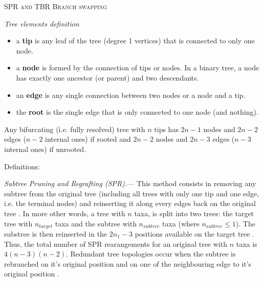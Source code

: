 \documentclass[12pt,letterpaper]{article}
\renewcommand{\section}[1]{%
\bigskip
\begin{center}
\begin{Large}
\normalfont\scshape #1
\medskip
\end{Large}
\end{center}}
\renewcommand{\subsection}[1]{%
\bigskip
\begin{center}
\begin{large}
\normalfont\itshape #1
\end{large}
\end{center}}
\renewcommand{\subsubsection}[1]{%
\vspace{2ex}
\noindent
\textit{#1.}---}
\begin{document}
\section{SPR and TBR Branch swapping}

\subsection{Tree elements definition}
\begin{itemize}
    \item a \textbf{tip} is any leaf of the tree (degree 1 vertices) that is connected to only one node.
    \item a \textbf{node} is formed by the connection of tips or nodes. In a binary tree, a node has exactly one ancestor (or parent) and two descendants.
    \item an \textbf{edge} is any single connection between two nodes or a node and a tip.
    \item the \textbf{root} is the single edge that is only connected to one node (and nothing).
\end{itemize}
Any bifurcating (i.e. fully resolved) tree with $n$ tips has $2n-1$ nodes and $2n-2$ edges ($n-2$ internal ones) if rooted and $2n-2$ nodes and $2n-3$ edges ($n-3$ internal ones) if unrooted.

Definitions: \cite{allen2001subtree,felsenstein2004inferring}

\subsubsection{Subtree Pruning and Regrafting (SPR)}
This method consists in removing any subtree from the original tree (including all trees with only one tip and one edge, i.e. the terminal nodes) and reinserting it along every edges back on the original tree \citep[see Fig \ref{Figure_Felsenstein};]{felsenstein2004inferring}.
In more other words, a tree with $n$ taxa, is split into two trees: the target tree with $n_{target}$ taxa and the subtree with $n_{subtree}$ taxa (where $n_{subtree} \leq 1$).
The substree is then reinserted in the $2n_{1}-3$ positions available on the target tree \citep{felsenstein2004inferring}.
Thus, the total number of SPR rearangements for an original tree with $n$ taxa is $4(n-3)(n-2)$.
Redundant tree topologies occur when the subtree is rebranched on it's original position and on one of the neighbouring edge to it's original position \citep{allen2001subtree}.
\end{document}
